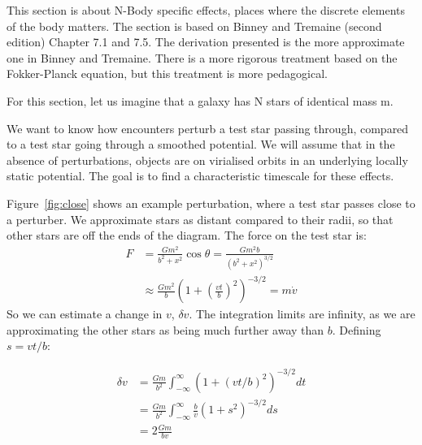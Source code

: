 \documentclass[12pt]{article}
\begin{document}
This section is about N-Body specific effects, places where the discrete elements of the body matters. The section is based on Binney and Tremaine (second edition) Chapter 7.1 and 7.5. The derivation presented is the more approximate one in Binney and Tremaine. There is a more rigorous treatment based on the Fokker-Planck equation, but this treatment is more pedagogical.

For this section, let us imagine that a galaxy has N stars of identical mass m.

We want to know how encounters perturb a test star passing through, compared to a test star going through a smoothed potential. We will assume that in the absence of perturbations, objects are on virialised orbits in an underlying locally static potential. The goal is to find a characteristic timescale for these effects.


Figure~\ref{fig:close} shows an example perturbation, where a test star passes close to a perturber. We approximate stars as distant compared to their radii, so that other stars are off the ends of the diagram. The force on the test star is:
\begin{align}
 F &= \frac{G m^2}{b^2 + x^2} \cos \theta = \frac{G m^2 b}{(b^2 + x^2)^{3/2}} \\
 &\approx \frac{Gm^2}{b} \left( 1 + \left(\frac{v t}{b}\right)^2\right)^{-3/2} = m \dot{v}
\end{align}
So we can estimate a change in $v$, $\delta v$. The integration limits are infinity, as we are approximating the other stars as being much further away than $b$. Defining $s = v t / b$:

\begin{align}
\delta v &= \frac{G m}{b^2} \int^\infty_{-\infty} (1 + (vt/b)^2)^{-3/2} dt \\
&= \frac{G m}{b^2} \int^\infty_{-\infty} \frac{b}{v} (1 + s^2)^{-3/2} ds \\
&= 2\frac{G m}{b v}
\end{align}
\end{document}
